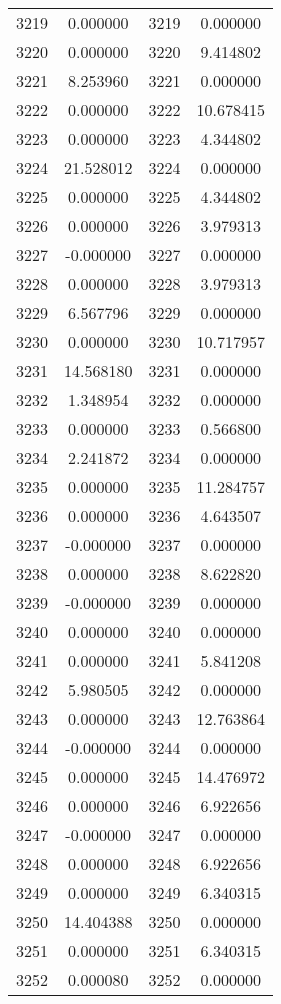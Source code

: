 \documentclass[12pt]{article}
\begin{document}
\begin{longtable}{@{}cccc@{}}
3219 & 0.000000 & 3219 & 0.000000 \\
3220 & 0.000000 & 3220 & 9.414802 \\
3221 & 8.253960 & 3221 & 0.000000 \\
3222 & 0.000000 & 3222 & 10.678415 \\
3223 & 0.000000 & 3223 & 4.344802 \\
3224 & 21.528012 & 3224 & 0.000000 \\
3225 & 0.000000 & 3225 & 4.344802 \\
3226 & 0.000000 & 3226 & 3.979313 \\
3227 & -0.000000 & 3227 & 0.000000 \\
3228 & 0.000000 & 3228 & 3.979313 \\
3229 & 6.567796 & 3229 & 0.000000 \\
3230 & 0.000000 & 3230 & 10.717957 \\
3231 & 14.568180 & 3231 & 0.000000 \\
3232 & 1.348954 & 3232 & 0.000000 \\
3233 & 0.000000 & 3233 & 0.566800 \\
3234 & 2.241872 & 3234 & 0.000000 \\
3235 & 0.000000 & 3235 & 11.284757 \\
3236 & 0.000000 & 3236 & 4.643507 \\
3237 & -0.000000 & 3237 & 0.000000 \\
3238 & 0.000000 & 3238 & 8.622820 \\
3239 & -0.000000 & 3239 & 0.000000 \\
3240 & 0.000000 & 3240 & 0.000000 \\
3241 & 0.000000 & 3241 & 5.841208 \\
3242 & 5.980505 & 3242 & 0.000000 \\
3243 & 0.000000 & 3243 & 12.763864 \\
3244 & -0.000000 & 3244 & 0.000000 \\
3245 & 0.000000 & 3245 & 14.476972 \\
3246 & 0.000000 & 3246 & 6.922656 \\
3247 & -0.000000 & 3247 & 0.000000 \\
3248 & 0.000000 & 3248 & 6.922656 \\
3249 & 0.000000 & 3249 & 6.340315 \\
3250 & 14.404388 & 3250 & 0.000000 \\
3251 & 0.000000 & 3251 & 6.340315 \\
3252 & 0.000080 & 3252 & 0.000000 \\

\end{longtable}
\end{document}
